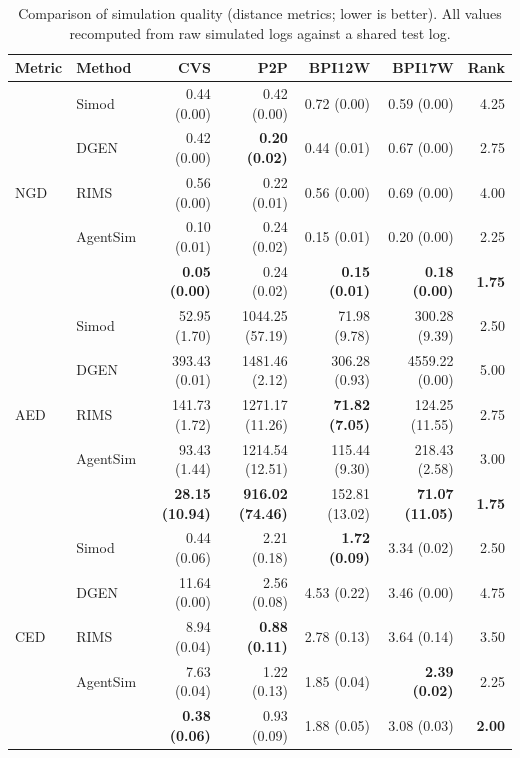 \begin{table}[t]
\centering
\small
\caption{Comparison of simulation quality (distance metrics; lower is better). All values recomputed from raw simulated logs against a shared test log.}
\label{tab:comparison}
\setlength{\tabcolsep}{3pt}
\begin{tabular}{llrrrrr}
\toprule
\textbf{Metric} & \textbf{Method} & \textbf{CVS} & \textbf{P2P} & \textbf{BPI12W} & \textbf{BPI17W} & \textbf{Rank} \\
\midrule
\multirow{5}{*}{NGD} & Simod & 0.44 (0.00) & 0.42 (0.00) & 0.72 (0.00) & 0.59 (0.00) & 4.25 \\
 & DGEN & 0.42 (0.00) & \textbf{0.20 (0.02)} & 0.44 (0.01) & 0.67 (0.00) & 2.75 \\
 & RIMS & 0.56 (0.00) & 0.22 (0.01) & 0.56 (0.00) & 0.69 (0.00) & 4.00 \\
 & AgentSim & 0.10 (0.01) & 0.24 (0.02) & 0.15 (0.01) & 0.20 (0.00) & 2.25 \\
 & \tool{} & \textbf{0.05 (0.00)} & 0.24 (0.02) & \textbf{0.15 (0.01)} & \textbf{0.18 (0.00)} & \textbf{1.75} \\
\midrule
\multirow{5}{*}{AED} & Simod & 52.95 (1.70) & 1044.25 (57.19) & 71.98 (9.78) & 300.28 (9.39) & 2.50 \\
 & DGEN & 393.43 (0.01) & 1481.46 (2.12) & 306.28 (0.93) & 4559.22 (0.00) & 5.00 \\
 & RIMS & 141.73 (1.72) & 1271.17 (11.26) & \textbf{71.82 (7.05)} & 124.25 (11.55) & 2.75 \\
 & AgentSim & 93.43 (1.44) & 1214.54 (12.51) & 115.44 (9.30) & 218.43 (2.58) & 3.00 \\
 & \tool{} & \textbf{28.15 (10.94)} & \textbf{916.02 (74.46)} & 152.81 (13.02) & \textbf{71.07 (11.05)} & \textbf{1.75} \\
\midrule
\multirow{5}{*}{CED} & Simod & 0.44 (0.06) & 2.21 (0.18) & \textbf{1.72 (0.09)} & 3.34 (0.02) & 2.50 \\
 & DGEN & 11.64 (0.00) & 2.56 (0.08) & 4.53 (0.22) & 3.46 (0.00) & 4.75 \\
 & RIMS & 8.94 (0.04) & \textbf{0.88 (0.11)} & 2.78 (0.13) & 3.64 (0.14) & 3.50 \\
 & AgentSim & 7.63 (0.04) & 1.22 (0.13) & 1.85 (0.04) & \textbf{2.39 (0.02)} & 2.25 \\
 & \tool{} & \textbf{0.38 (0.06)} & 0.93 (0.09) & 1.88 (0.05) & 3.08 (0.03) & \textbf{2.00} \\

\end{tabular}
\end{table}
